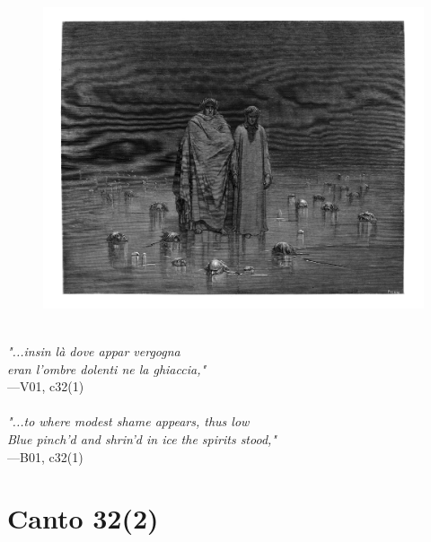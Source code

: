 \documentclass[../Dore_vision.tex]{subfiles}
\begin{document}
\begin{figure}[ht]
\centering
\includegraphics[height=\figsize]{illustrations/book_1/V01, c32(1).jpg}
\end{figure}

\begin{center}
\begin{minipage}{0.8\linewidth}
\textit{\\
"...insin là dove appar vergogna\\eran l’ombre dolenti ne la ghiaccia,"} \\
—V01, c32(1) \\~\\
\textit{"...to where modest shame appears, thus low\\Blue pinch'd and shrin'd in ice the spirits stood,"} \\
—B01, c32(1)
\end{minipage}
\end{center}

\newpage

\section{Canto 32(2)}
\end{document}
